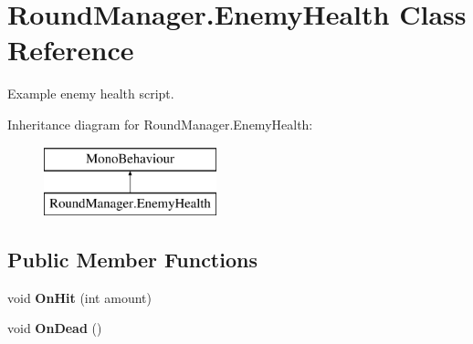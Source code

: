 \hypertarget{class_round_manager_1_1_enemy_health}{}\section{Round\+Manager.\+Enemy\+Health Class Reference}
\label{class_round_manager_1_1_enemy_health}


Example enemy health script.  


Inheritance diagram for Round\+Manager.\+Enemy\+Health\+:\begin{figure}[H]
\begin{center}
\leavevmode
\includegraphics[height=2.000000cm]{class_round_manager_1_1_enemy_health}
\end{center}
\end{figure}
\subsection*{Public Member Functions}
\begin{DoxyCompactItemize}
\item 
\hypertarget{class_round_manager_1_1_enemy_health_a3d5bc94b8deb7e985d22e8fcaa70100d}{}void {\bfseries On\+Hit} (int amount)\label{class_round_manager_1_1_enemy_health_a3d5bc94b8deb7e985d22e8fcaa70100d}

\item 
\hypertarget{class_round_manager_1_1_enemy_health_a74b7cb053c7a612802cc37bb572f4538}{}void {\bfseries On\+Dead} ()\label{class_round_manager_1_1_enemy_health_a74b7cb053c7a612802cc37bb572f4538}

\end{DoxyCompactItemize}
